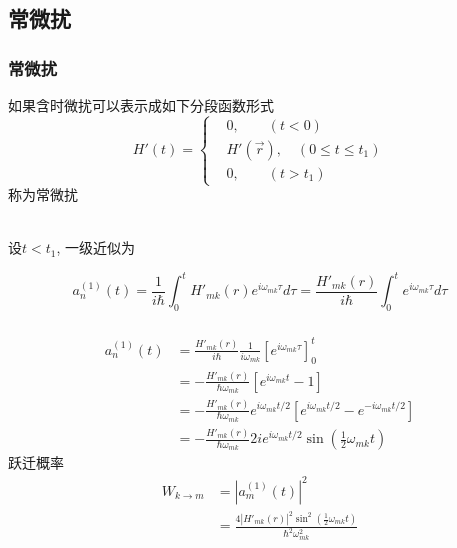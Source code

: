 \subsection{常微扰}

\begin{frame} 
  \frametitle{常微扰}
如果含时微扰可以表示成如下分段函数形式
\[ H'(t) = \left\{
  \begin{aligned}
   &0, \qquad (t<0)\\
   &H'(\vec{r}), \quad (0\le t \le t_1) \\
   &0, \qquad (t > t_1) 
  \end{aligned}\right. \]
称为常微扰

~~\\ 
设$t<t_1$, 一级近似为

\[ a^{(1)}_n(t) = \frac{1}{i\hbar}\int_{0}^{t} H'_{mk}(r)  e^{i \omega _{mk} \tau} d\tau = \frac{H'_{mk}(r)}{i\hbar}\int_{0}^{t} e^{i \omega _{mk} \tau} d\tau \]
\end{frame} 

\begin{frame} 
  \frametitle{}
\[ 
\begin{aligned}
  a^{(1)}_n(t) &= \frac{H'_{mk}(r)}{i\hbar} \frac{1}{i \omega _{mk}} \left[ e^{i \omega _{mk}\tau }\right]^t _0 \\ 
  &= - \frac{H'_{mk}(r) }{ \hbar \omega _{mk}}\left[ e^{i \omega _{mk}t} -1\right] \\
  &= - \frac{H'_{mk}(r) }{ \hbar \omega _{mk}} e^{i \omega _{mk}t/2} \left[e^{i \omega _{mk}t/2} -e^{-i \omega _{mk}t/2}\right] \\
  &= - \frac{H'_{mk}(r) }{ \hbar \omega _{mk}}  2i e^{i \omega _{mk}t/2} \sin(\frac{1}{2} \omega _{mk} t )
\end{aligned}  
\]
跃迁概率 
\begin{equation*}
  \begin{aligned}
    W_{k\to m} &= \left\vert a^{(1)}_m(t)\right\vert ^2 \\
    &= \frac{4 \left\vert H'_{mk}(r)\right\vert ^2 \sin^2(\frac{1}{2} \omega _{mk} t ) }{\hbar^2 \omega ^2 _{mk}} 
  \end{aligned}
\end{equation*}
\end{frame} 

